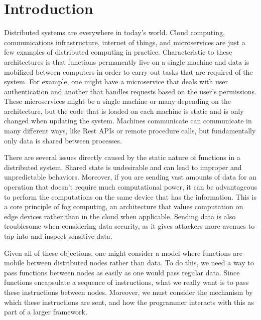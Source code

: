
\chapter{Introduction}
\label{cha:introduction}



Distributed systems are everywhere in today's world. Cloud computing, communications infrastructure, internet of things, and microservices are just a few examples of distributed computing in practice. Characteristic to these architectures is that functions permanently live on a single machine and data is mobilized between computers in order to carry out tasks that are required of the system. For example, one might have a microservice that deals with user authentication and another that handles requests based on the user's permissions. These microservices might be a single machine or many depending on the architecture, but the code that is loaded on each machine is static and is only changed when updating the system. Machines communicate can communicate in many different ways, like Rest APIs or remote procedure calls, but fundamentally only data is shared between processes.


There are several issues directly caused by the static nature of functions in a distributed system. Shared state is undesirable and can lead to improper and unpredictable behaviors. Moreover, if you are sending vast amounts of data for an operation that doesn't require much computational power, it can be advantageous to perform the computations on the same device that has the information. This is a core principle of fog computing, an architecture that values computation on edge devices rather than in the cloud when applicable. Sending data is also troublesome when considering data security, as it gives attackers more avenues to tap into and inspect sensitive data.

Given all of these objections, one might consider a model where functions are mobile between distributed nodes rather than data. To do this, we need a way to pass functions between nodes as easily as one would pass regular data. Since functions encapsulate a sequence of instructions, what we really want is to pass these instructions between nodes. Moreover, we must consider the mechanism by which these instructions are sent, and how the programmer interacts with this as part of a larger framework. 

